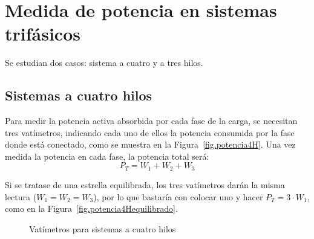 \documentclass[11pt]{book} %
\begin{document}
	\section{Medida de potencia en sistemas trifásicos} 
	
	Se estudian dos casos: sistema a cuatro y a tres hilos.
	
	\subsection{Sistemas a cuatro hilos}
	Para medir la potencia activa absorbida por cada fase de la carga, se necesitan tres vatímetros, indicando cada uno de ellos la potencia consumida por la fase donde está conectado, como se muestra en la Figura~\ref{fig.potencia4H}. Una vez medida la potencia en cada fase, la potencia total será:
	\begin{equation}
		\boxed{P_T=W_1+W_2+W_3}
	\end{equation}
	
	\begin{remark}
	    Si se tratase de una estrella equilibrada, los tres vatímetros darán la misma lectura ($W_1=W_2=W_3$), por lo que bastaría con colocar uno y hacer $P_T=3\cdot W_1$, como en la Figura~\ref{fig.potencia4Hequilibrado}.
	\end{remark}
	\begin{figure}[htbp]
		\centering
		\hfill
		\caption{Vatímetros para sistemas a cuatro hilos}
		\label{fig.vatimetro4hilos}
	\end{figure}
	
\end{document}
